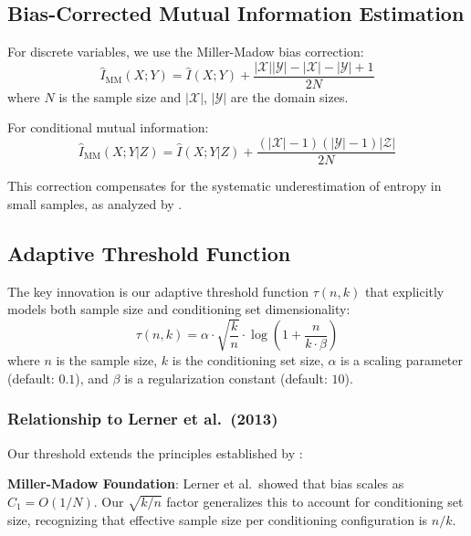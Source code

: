 \documentclass{article}
\theoremstyle{plain}
\theoremstyle{definition}
\begin{document}
\subsection{Bias-Corrected Mutual Information Estimation}\label{sec:bias_correction}

For discrete variables, we use the Miller-Madow bias correction:
\begin{equation}
\hat{I}_{\text{MM}}(X;Y) = \hat{I}(X;Y) + \frac{|\mathcal{X}||\mathcal{Y}| - |\mathcal{X}| - |\mathcal{Y}| + 1}{2N}
\end{equation}
where $N$ is the sample size and $|\mathcal{X}|$, $|\mathcal{Y}|$ are the domain sizes.

For conditional mutual information:
\begin{equation}
\hat{I}_{\text{MM}}(X;Y|Z) = \hat{I}(X;Y|Z) + \frac{(|\mathcal{X}|-1)(|\mathcal{Y}|-1)|\mathcal{Z}|}{2N}
\end{equation}

This correction compensates for the systematic underestimation of entropy in small samples, as analyzed by \citet{lerner2013adaptive}.

\subsection{Adaptive Threshold Function}\label{sec:threshold}

The key innovation is our adaptive threshold function $\tau(n, k)$ that explicitly models both sample size and conditioning set dimensionality:
\begin{equation}
\tau(n, k) = \alpha \cdot \sqrt{\frac{k}{n}} \cdot \log\left(1 + \frac{n}{k \cdot \beta}\right)
\end{equation}
where $n$ is the sample size, $k$ is the conditioning set size, $\alpha$ is a scaling parameter (default: $0.1$), and $\beta$ is a regularization constant (default: $10$).

\subsubsection{Relationship to Lerner et al.~(2013)}

Our threshold extends the principles established by \citet{lerner2013adaptive}:

\textbf{Miller-Madow Foundation}: Lerner et al.~showed that bias scales as $C_1 = O(1/N)$. Our $\sqrt{k/n}$ factor generalizes this to account for conditioning set size, recognizing that effective sample size per conditioning configuration is $n/k$.
\end{document}
